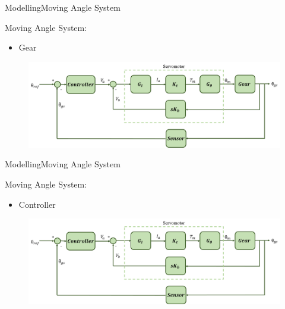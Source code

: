 \begin{frame}{Modelling}{Moving Angle System}
  \begin{block}{Moving Angle System:}

	  \begin{itemize}
	  	\item Gear
	  \end{itemize}

	  \begin{figure}
        \includegraphics[scale=0.26]{../report/figures/servo+gear+noise.png}
      \end{figure}
  
  \end{block}
\end{frame}

\begin{frame}{Modelling}{Moving Angle System}
  \begin{block}{Moving Angle System:}

	  \begin{itemize}
	  	\item Controller
	  \end{itemize}

	  \begin{figure}
        \includegraphics[scale=0.26]{../report/figures/servo+gear+noise.png}
      \end{figure}
  
  \end{block}
\end{frame}



